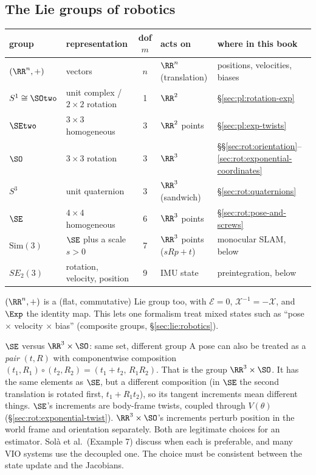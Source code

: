 \subsection{The Lie groups of robotics}\label{sec:lie:catalogue}

\begin{center}\small
\renewcommand{\arraystretch}{1.15}
\begin{tabularx}{\linewidth}{@{}l l c >{\raggedright\arraybackslash}X >{\raggedright\arraybackslash}X@{}}\toprule
group & representation & dof $m$ & acts on & where in this book\\\midrule
$(\RR^n,+)$ & vectors & $n$ & $\RR^n$ (translation) & positions, velocities, biases\\
$S^1\cong\SOtwo$ & unit complex / $2\times2$ rotation & 1 & $\RR^2$ & \S\ref{sec:pl:rotation-exp}\\
$\SEtwo$ & $3\times3$ homogeneous & 3 & $\RR^2$ points & \S\ref{sec:pl:exp-twists}\\
$\SO$ & $3\times3$ rotation & 3 & $\RR^3$ & \S\S\ref{sec:rot:orientation}--\ref{sec:rot:exponential-coordinates}\\
$S^3$ & unit quaternion & 3 & $\RR^3$ (sandwich) & \S\ref{sec:rot:quaternions}\\
$\SE$ & $4\times4$ homogeneous & 6 & $\RR^3$ points & \S\ref{sec:rot:pose-and-screws}\\
$\mathrm{Sim}(3)$ & $\SE$ plus a scale $s>0$ & 7 & $\RR^3$ points ($sRp+t$) & monocular SLAM, below\\
$SE_2(3)$ & rotation, velocity, position & 9 & IMU state & preintegration, below\\\bottomrule
\end{tabularx}
\end{center}
$(\RR^n,+)$ is a (flat, commutative) Lie group too, with $\mathcal E=0$, $\mathcal X^{-1}=-\mathcal X$, and $\Exp$ the identity map. This lets one formalism treat mixed states such as ``pose $\times$ velocity $\times$ bias'' (composite groups, \S\ref{sec:lie:robotics}).

\begin{noteb}{$\SE$ versus $\RR^3\times\SO$: same set, different group}
A pose can also be treated as a \emph{pair} $(t,R)$ with componentwise composition $(t_1,R_1)\circ(t_2,R_2)=(t_1+t_2,\,R_1R_2)$. That is the group $\RR^3\times\SO$. It has the same elements as $\SE$, but a different composition (in $\SE$ the second translation is rotated first, $t_1+R_1t_2$), so its tangent increments mean different things. $\SE$'s increments are body-frame twists, coupled through $V(\theta)$ (\S\ref{sec:rot:exponential-twist}). $\RR^3\times\SO$'s increments perturb position in the world frame and orientation separately. Both are legitimate choices for an estimator. Solà et al.\ (Example 7) discuss when each is preferable, and many VIO systems use the decoupled one. The choice must be consistent between the state update and the Jacobians.
\end{noteb}
